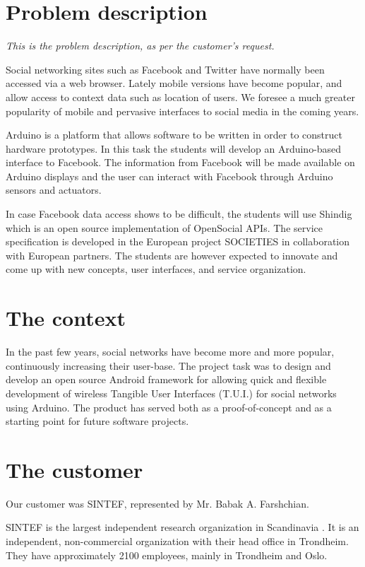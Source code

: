 \section{Problem description}

\emph{This is the problem description, as per the customer's request.}

Social networking sites such as Facebook and Twitter have normally been accessed  via a web browser.
Lately mobile versions have become popular, and allow access to context data such as location of
users. We foresee a much greater popularity of mobile and pervasive interfaces to social media in
the coming years.

Arduino\cite{link:arduino} is a platform that allows software to be written in order to construct
hardware prototypes. In this task the students will develop an Arduino-based interface to Facebook.
The information from Facebook will be made available on Arduino displays and the user can interact
with Facebook through Arduino sensors and actuators.

In case Facebook data access shows to be difficult, the students will use Shindig\cite{link:shinding} which 
is an open source implementation of OpenSocial APIs. The service specification is developed in the European project 
SOCIETIES in collaboration with European partners. The students are however expected to innovate and come up 
with new concepts, user interfaces, and service organization.

\section{The context}
In the past few years, social networks have become more and more popular, continuously increasing their user-base.
The project task was to design and develop an open source Android\cite{link:android} framework for allowing quick
and flexible development of wireless Tangible User Interfaces (T.U.I.) for social networks using Arduino.
The product has served both as a proof-of-concept and as a starting point for future software projects.

\section{The customer}
Our customer was SINTEF, represented by Mr. Babak A. Farshchian.

SINTEF is the largest independent research organization in Scandinavia \cite{link:sintef}.
It is an independent, non-commercial organization with their head office in Trondheim. They have approximately 2100 employees, mainly in Trondheim and Oslo.

